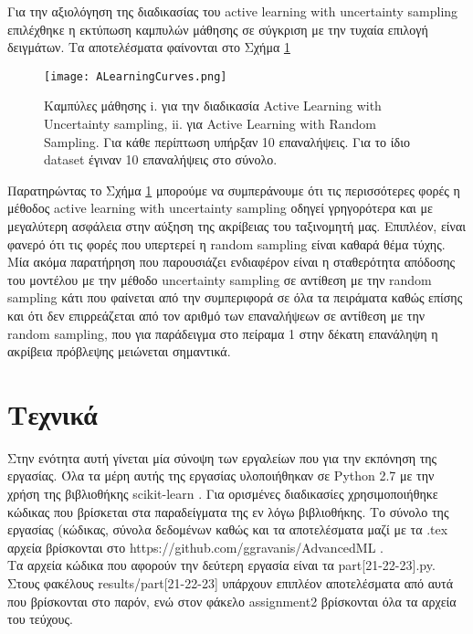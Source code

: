 Για την αξιολόγηση της διαδικασίας του active learning with uncertainty sampling επιλέχθηκε η εκτύπωση καμπυλών μάθησης σε σύγκριση με την τυχαία επιλογή δειγμάτων. Τα αποτελέσματα φαίνονται στο Σχήμα \ref{fig: Active Learning Curves}


\begin{figure}
	\texttt{[image: ALearningCurves.png]} %
	\caption{Καμπύλες μάθησης i. για την διαδικασία Active Learning with Uncertainty sampling, ii. για Active Learning with Random Sampling. Για κάθε περίπτωση υπήρξαν 10 επαναλήψεις. Για το ίδιο dataset έγιναν 10 επαναλήψεις στο σύνολο.}
	\label{fig: Active Learning Curves}
\end{figure}


Παρατηρώντας το Σχήμα \ref{fig: Active Learning Curves} μπορούμε να συμπεράνουμε ότι τις περισσότερες φορές η μέθοδος active learning with uncertainty sampling οδηγεί γρηγορότερα και με μεγαλύτερη ασφάλεια στην αύξηση της ακρίβειας του ταξινομητή μας. Επιπλέον, είναι φανερό ότι τις φορές που υπερτερεί η random sampling είναι καθαρά θέμα τύχης. Μία ακόμα παρατήρηση που παρουσιάζει ενδιαφέρον είναι η σταθερότητα απόδοσης του μοντέλου με την μέθοδο uncertainty sampling σε αντίθεση με την random sampling κάτι που φαίνεται από την συμπεριφορά σε όλα τα πειράματα καθώς επίσης και ότι δεν επιρρεάζεται από τον αριθμό των επαναλήψεων σε αντίθεση με την random sampling, που για παράδειγμα στο πείραμα 1 στην δέκατη επανάληψη η ακρίβεια πρόβλεψης μειώνεται σημαντικά.


\section{Τεχνικά}

Στην ενότητα αυτή γίνεται μία σύνοψη των εργαλείων που για την εκπόνηση της εργασίας.
Όλα τα μέρη αυτής της εργασίας υλοποιήθηκαν σε Python 2.7 με την χρήση της βιβλιοθήκης scikit-learn \citep{scikit-learn}. Για ορισμένες διαδικασίες χρησιμοποιήθηκε κώδικας που βρίσκεται στα παραδείγματα της εν λόγω βιβλιοθήκης. Το σύνολο της εργασίας (κώδικας, σύνολα δεδομένων καθώς και τα αποτελέσματα μαζί με τα .tex αρχεία βρίσκονται στο https://github.com/ggravanis/AdvancedML . \\
Τα αρχεία κώδικα που αφορούν την δεύτερη εργασία είναι τα part[21-22-23].py. Στους φακέλους results/part[21-22-23] υπάρχουν επιπλέον αποτελέσματα από αυτά που βρίσκονται στο παρόν, ενώ στον φάκελο assignment2 βρίσκονται όλα τα αρχεία του τεύχους.
